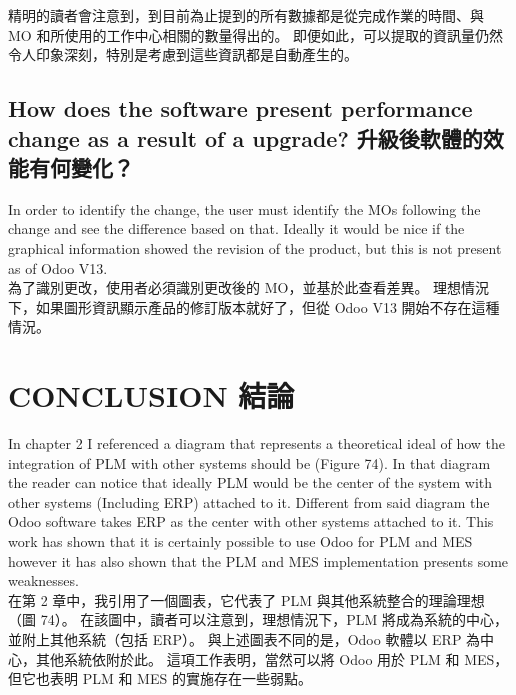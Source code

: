 \fontsize{12pt}{2.5pt}\selectfont
{精明的讀者會注意到，到目前為止提到的所有數據都是從完成作業的時間、與 MO 和所使用的工作中心相關的數量得出的。 即便如此，可以提取的資訊量仍然令人印象深刻，特別是考慮到這些資訊都是自動產生的。}\\[1pt]

\section{How does the software present performance change as a result of a upgrade? 升級後軟體的效能有何變化？}
\fontsize{12pt}{2.5pt}\selectfont 
{In order to identify the change, the user must identify the MOs following the change and see the difference based on that. Ideally it would be nice if the graphical information showed the revision of the product, but this is not present as of Odoo V13.}\\[1pt]

\fontsize{12pt}{2.5pt}\selectfont
{為了識別更改，使用者必須識別更改後的 MO，並基於此查看差異。 理想情況下，如果圖形資訊顯示產品的修訂版本就好了，但從 Odoo V13 開始不存在這種情況。}\\[1pt]

\chapter{CONCLUSION 結論} 

\fontsize{12pt}{2.5pt}\selectfont 
{In chapter 2 I referenced a diagram that represents a theoretical ideal of how the integration of PLM with other systems should be (Figure 74). In that diagram the reader can notice that ideally PLM would be the center of the system with other systems (Including ERP) attached to it. Different from said diagram the Odoo software takes ERP as the center with other systems attached to it. This work has shown that it is certainly possible to use Odoo for PLM and MES however it has also shown that the PLM and MES implementation presents some weaknesses.}\\[1pt]

\fontsize{12pt}{2.5pt}\selectfont
{在第 2 章中，我引用了一個圖表，它代表了 PLM 與其他系統整合的理論理想（圖 74）。 在該圖中，讀者可以注意到，理想情況下，PLM 將成為系統的中心，並附上其他系統（包括 ERP）。 與上述圖表不同的是，Odoo 軟體以 ERP 為中心，其他系統依附於此。 這項工作表明，當然可以將 Odoo 用於 PLM 和 MES，但它也表明 PLM 和 MES 的實施存在一些弱點。}\\[1pt]

